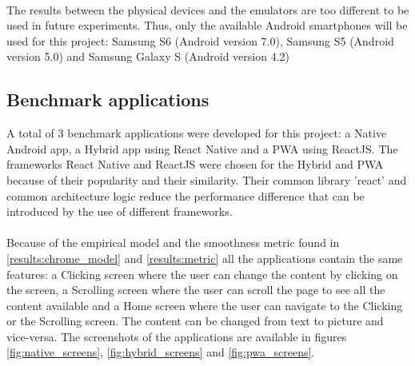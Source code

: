 \documentclass{kththesis}
\begin{document}
\begin{table}[!ht]

    \caption{Emulators Tests}
    \label{tab:emulators_test}
\end{table}

\paragraph{}
The results between the physical devices and the emulators are too different to be used in future experiments. Thus, only the available Android smartphones will be used for this project: Samsung S6 (Android version 7.0), Samsung S5 (Android version 5.0) and Samsung Galaxy S (Android version 4.2)


\subsection{Benchmark applications}

A total of 3 benchmark applications were developed for this project: a Native Android app, a Hybrid app using React Native and a PWA using ReactJS. The frameworks React Native and ReactJS were chosen for the Hybrid and PWA because of their popularity and their similarity. Their common library 'react' and common architecture logic reduce the performance difference that can be introduced by the use of different frameworks.

\paragraph{}
Because of the empirical model and the smoothness metric found in \autoref{results:chrome_model} and \autoref{results:metric} all the applications contain the same features: a Clicking screen where the user can change the content by clicking on the screen, a Scrolling screen where the user can scroll the page to see all the content available and a Home screen where the user can navigate to the Clicking or the Scrolling screen. The content can be changed from text to picture and vice-versa. The screenshots of the applications are available in figures \ref{fig:native_screens}, \ref{fig:hybrid_screens} and \ref{fig:pwa_screens}.
\end{document}
